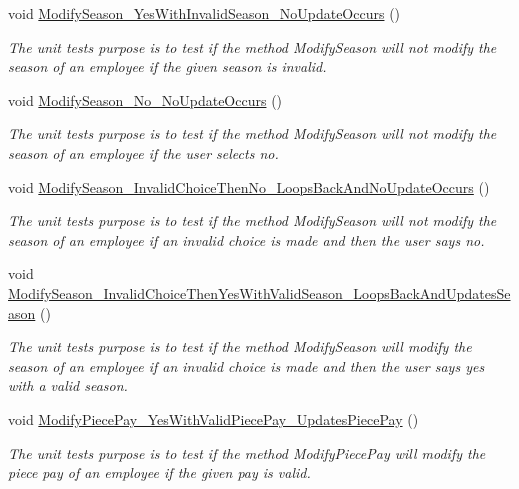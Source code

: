 \begin{DoxyCompactItemize}
void \hyperlink{class_the_company_1_1_tests_1_1_modify_employee_tests_a5c656c99e47c8e14edc14dfacadd52e7}{Modify\+Season\+\_\+\+Yes\+With\+Invalid\+Season\+\_\+\+No\+Update\+Occurs} ()
\begin{DoxyCompactList}\small\item\em The unit test\textquotesingle{}s purpose is to test if the method Modify\+Season will not modify the season of an employee if the given season is invalid. \end{DoxyCompactList}\item 
void \hyperlink{class_the_company_1_1_tests_1_1_modify_employee_tests_a66e8dc6ab20ff74294d9cbcc702ccda0}{Modify\+Season\+\_\+\+No\+\_\+\+No\+Update\+Occurs} ()
\begin{DoxyCompactList}\small\item\em The unit test\textquotesingle{}s purpose is to test if the method Modify\+Season will not modify the season of an employee if the user selects no. \end{DoxyCompactList}\item 
void \hyperlink{class_the_company_1_1_tests_1_1_modify_employee_tests_a3198dbb6359399cac5b301a7327a634b}{Modify\+Season\+\_\+\+Invalid\+Choice\+Then\+No\+\_\+\+Loops\+Back\+And\+No\+Update\+Occurs} ()
\begin{DoxyCompactList}\small\item\em The unit test\textquotesingle{}s purpose is to test if the method Modify\+Season will not modify the season of an employee if an invalid choice is made and then the user says no. \end{DoxyCompactList}\item 
void \hyperlink{class_the_company_1_1_tests_1_1_modify_employee_tests_ae02a145666db1e3ec93368ed8a88fd48}{Modify\+Season\+\_\+\+Invalid\+Choice\+Then\+Yes\+With\+Valid\+Season\+\_\+\+Loops\+Back\+And\+Updates\+Season} ()
\begin{DoxyCompactList}\small\item\em The unit test\textquotesingle{}s purpose is to test if the method Modify\+Season will modify the season of an employee if an invalid choice is made and then the user says yes with a valid season. \end{DoxyCompactList}\item 
void \hyperlink{class_the_company_1_1_tests_1_1_modify_employee_tests_aa8f40fb832f2ae5eee928b96bd3fdd71}{Modify\+Piece\+Pay\+\_\+\+Yes\+With\+Valid\+Piece\+Pay\+\_\+\+Updates\+Piece\+Pay} ()
\begin{DoxyCompactList}\small\item\em The unit test\textquotesingle{}s purpose is to test if the method Modify\+Piece\+Pay will modify the piece pay of an employee if the given pay is valid. \end{DoxyCompactList}\item 

\end{DoxyCompactItemize}
